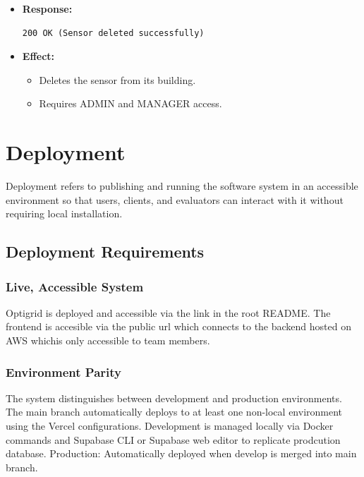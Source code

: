 \documentclass[12pt, a4paper]{article}
\begin{document}
\begin{enumerate}
\begin{itemize}
        \item \textbf{Response:}
        \begin{verbatim}
200 OK (Sensor deleted successfully)
        \end{verbatim}
        \item \textbf{Effect:}
        \begin{itemize}
            \item Deletes the sensor from its building.
            \item Requires ADMIN and MANAGER access.
        \end{itemize}
    \end{itemize}
\end{enumerate}


\newpage
\section{Deployment}

Deployment refers to publishing and running the software system in an accessible environment so that users, clients, and evaluators can interact with it without requiring local installation.

\subsection{Deployment Requirements}

\subsubsection{Live, Accessible System}

Optigrid is deployed and accessible via the link in the root README. The frontend is accesible via the public url which connects to the backend hosted on AWS whichis only accessible to team members.

\subsubsection{Environment Parity}

The system distinguishes between development and production environments. The main branch automatically deploys to at least one non-local environment using the Vercel configurations. 
Development is managed locally via Docker commands and Supabase CLI or Supabase web editor to replicate prodcution database.
Production: Automatically deployed when develop is merged into main branch.
\end{document}
